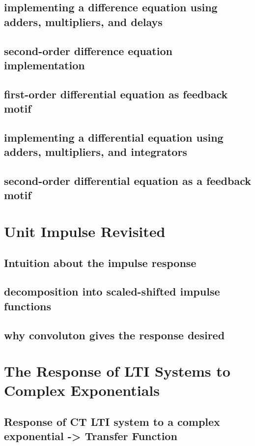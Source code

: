 \documentclass{article}
\begin{document}
\subsection{implementing a difference equation using adders, multipliers, and delays}
\label{sec:org7e3b256}
\subsection{second-order difference equation implementation}
\label{sec:org86279c9}
\subsection{first-order differential equation as feedback motif}
\label{sec:org3fcff6e}
\subsection{implementing a differential equation using adders, multipliers, and integrators}
\label{sec:org60f5c97}
\subsection{second-order differential equation as a feedback motif}
\label{sec:orgcc26b56}
\section{Unit Impulse Revisited}
\label{sec:org9c858ee}
\subsection{Intuition about the impulse response}
\label{sec:org8432368}
\subsection{decomposition into scaled-shifted impulse functions}
\label{sec:org23917a7}
\subsection{why convoluton gives the response desired}
\label{sec:org7ad3b62}
\section{The Response of LTI Systems to Complex Exponentials}
\label{sec:org0d3d3bf}
\subsection{Response of CT LTI system to a complex exponential -> Transfer Function}
\label{sec:orgee51d0b}
\end{document}
